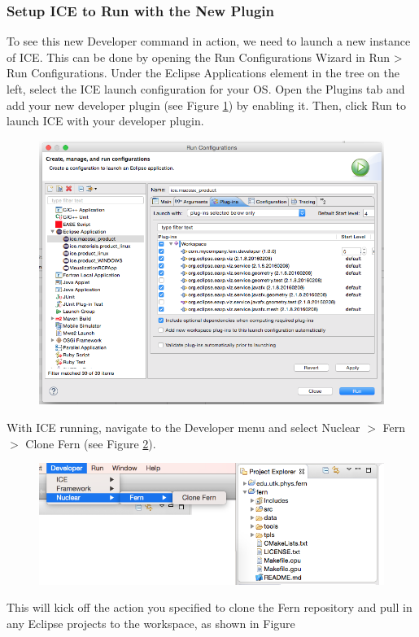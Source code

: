 \documentclass{article}
\begin{document}
\subsubsection*{Setup ICE to Run with the New Plugin}
To see this new Developer command in action, we need to launch a new instance of
ICE. This can be done by opening the Run Configurations Wizard in Run > Run
Configurations. Under the Eclipse Applications element in the tree on the left,
select the ICE launch configuration for your OS. Open the Plugins tab and add
your new developer plugin (see Figure \ref{fig:launch}) by enabling it. Then,
click Run to launch ICE with your developer plugin. 
\begin{figure}[h]
\includegraphics[width=\textwidth]{figures/launch.png}
\label{fig:launch}
\end{figure}
With ICE running, navigate to the Developer menu and select Nuclear $>$ Fern $>$
Clone Fern (see Figure \ref{fig:clonefern}).
\begin{figure}[h]
\includegraphics[width=\textwidth]{figures/cloned.png}
\label{fig:clonefern}
\end{figure}

This will kick off the action you specified to clone the Fern repository and
pull in any Eclipse projects to the workspace, as shown in Figure
\end{document}
